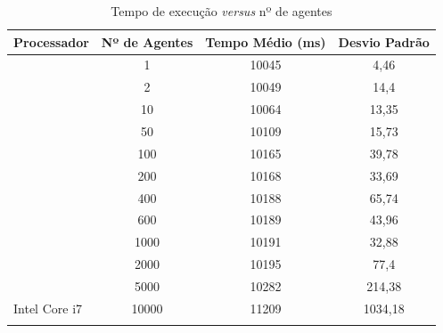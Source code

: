 \documentclass[conference]{IEEEtran}
\begin{document}
        \begin{table}[ht]
            \centering
            \caption{Tempo de execução \textit{versus} nº de agentes}
            \label{tab:resultadostab}
            \begin{tabular}{|l|c|c|c|}
            \hline
            Processador                                              & Nº de Agentes & Tempo Médio (ms) & Desvio Padrão \\ \hline
                                                                     & 1             & 10045            & 4,46          \\ \cline{2-4} 
                                                                     & 2             & 10049            & 14,4          \\ \cline{2-4} 
                                                                     & 10            & 10064            & 13,35         \\ \cline{2-4} 
                                                                     & 50            & 10109            & 15,73         \\ \cline{2-4} 
                                                                     & 100           & 10165            & 39,78         \\ \cline{2-4} 
                                                                     & 200           & 10168            & 33,69         \\ \cline{2-4} 
                                                                     & 400           & 10188            & 65,74         \\ \cline{2-4} 
                                                                     & 600           & 10189            & 43,96         \\ \cline{2-4} 
                                                                     & 1000          & 10191            & 32,88         \\ \cline{2-4} 
                                                                     & 2000          & 10195            & 77,4          \\ \cline{2-4} 
                                                                     & 5000          & 10282            & 214,38        \\ \cline{2-4} 
            \multirow{-12}{*}{Intel Core i7}                         & 10000         & 11209            & 1034,18       \\ \hline
            \rowcolor[HTML]{EFEFEF} 

\end{tabular}
\end{table}
\end{document}
